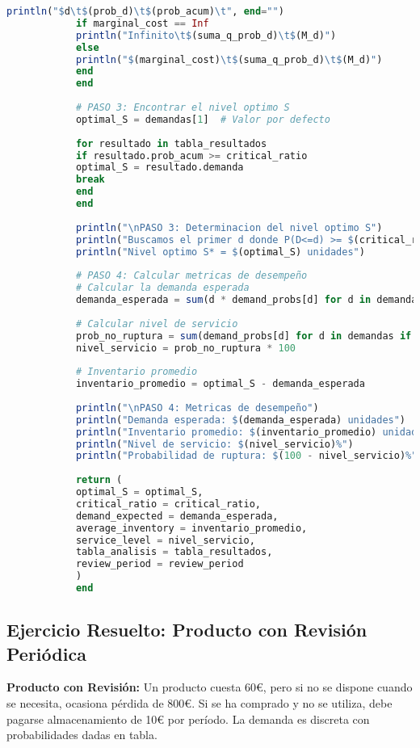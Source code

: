 \documentclass[12pt,a4paper]{book}
\begin{document}
\begin{tcolorbox}[enhanced,colback=violetaclaro,colframe=moradoacento,boxrule=3pt,arc=12pt,
		drop shadow,title={\Large\bfseries\color{white} \faCalendar\ MODELO (R,S) DE REVISION PERIODICA},breakable]
\begin{lstlisting}[language=Julia,basicstyle=\footnotesize\ttfamily]
			println("$d\t$(prob_d)\t$(prob_acum)\t", end="")
			if marginal_cost == Inf
			println("Infinito\t$(suma_q_prob_d)\t$(M_d)")
			else
			println("$(marginal_cost)\t$(suma_q_prob_d)\t$(M_d)")
			end
			end
			
			# PASO 3: Encontrar el nivel optimo S
			optimal_S = demandas[1]  # Valor por defecto
			
			for resultado in tabla_resultados
			if resultado.prob_acum >= critical_ratio
			optimal_S = resultado.demanda
			break
			end
			end
			
			println("\nPASO 3: Determinacion del nivel optimo S")
			println("Buscamos el primer d donde P(D<=d) >= $(critical_ratio)")
			println("Nivel optimo S* = $(optimal_S) unidades")
			
			# PASO 4: Calcular metricas de desempeño
			# Calcular la demanda esperada
			demanda_esperada = sum(d * demand_probs[d] for d in demandas)
			
			# Calcular nivel de servicio
			prob_no_ruptura = sum(demand_probs[d] for d in demandas if d <= optimal_S)
			nivel_servicio = prob_no_ruptura * 100
			
			# Inventario promedio
			inventario_promedio = optimal_S - demanda_esperada
			
			println("\nPASO 4: Metricas de desempeño")
			println("Demanda esperada: $(demanda_esperada) unidades")
			println("Inventario promedio: $(inventario_promedio) unidades")
			println("Nivel de servicio: $(nivel_servicio)%")
			println("Probabilidad de ruptura: $(100 - nivel_servicio)%")
			
			return (
			optimal_S = optimal_S,
			critical_ratio = critical_ratio,
			demand_expected = demanda_esperada,
			average_inventory = inventario_promedio,
			service_level = nivel_servicio,
			tabla_analisis = tabla_resultados,
			review_period = review_period
			)
			end
		\end{lstlisting}
		
	\end{tcolorbox}
	
	\subsection{Ejercicio Resuelto: Producto con Revisi\'on Peri\'odica}
	
	\begin{tcolorbox}[enhanced,colback=naranjaclaro,colframe=naranjaacento,boxrule=2pt,arc=8pt,
		drop shadow,title={\bfseries\color{white} \faPuzzlePiece\ PROBLEMA DE REVISI\'ON PERI\'ODICA}]
		
		\textbf{Producto con Revisi\'on:} Un producto cuesta 60€, pero si no se dispone cuando se necesita, ocasiona pérdida de 800€. Si se ha comprado y no se utiliza, debe pagarse almacenamiento de 10€ por período. La demanda es discreta con probabilidades dadas en tabla.
		
	\end{tcolorbox}
	
\end{document}
